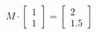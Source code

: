 \documentclass[preview]{standalone}
\begin{document}
\begin{align*}
M \cdot \begin{bmatrix} 1 \\ 1 \end{bmatrix} = \begin{bmatrix} 2 \\ 1.5 \end{bmatrix}
\end{align*}
\end{document}
